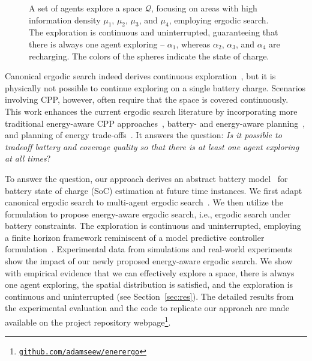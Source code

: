 \documentclass[letterpaper,10pt,conference,twoside]{IEEEtran}
\theoremstyle{definition}
\begin{document}
\begin{figure}[t!]
  \centering
  \hspace*{-.04cm}
  \caption{A set of agents explore a space $\mathcal{Q}$, focusing on areas with high information density $\mu_1$, $\mu_2$, $\mu_3$, and $\mu_4$, employing ergodic search. The exploration is continuous and uninterrupted, guaranteeing that there is always one agent exploring -- $\alpha_1$, whereas $\alpha_2$, $\alpha_3$, and $\alpha_4$ are recharging. The colors of the spheres indicate the state of charge.}
  \label{fig:abs}
  \vspace*{-.2cm}
\end{figure}

Canonical ergodic search indeed derives continuous exploration~\cite{%
miller2013trajectory,miller2016ergodic,abraham2017ergodic}, but it is physically not possible to continue exploring on a single battery charge. 
Scenarios involving CPP, however, often require that the space is covered continuously.
This work enhances the current ergodic search literature by incorporating more traditional energy-aware CPP approaches~\cite{difranco2015energy,difranco2016coverage,shnaps2016online,cabreira2018energy,wei2018coverage,jensen2021near}, battery- and energy-aware planning~\cite{mei2004energy,mei2005case,kim2005energy,seewald2022energy}, and planning of energy trade-offs~\cite{ondruska2015scheduled,sudhakar2020balancing}. It answers the question: \textit{Is it possible to tradeoff battery and coverage quality so that there is at least one agent exploring %
at all times}?

To answer the question, our approach derives an abstract battery model~\cite{zhao2017observability} for battery state of charge (SoC) estimation at future time instances. We first adapt canonical ergodic search to multi-agent ergodic search~\cite{prabhakar2020ergodic,coffin2022multi}. We then utilize the formulation to propose energy-aware ergodic search, i.e., ergodic search under battery constraints. The exploration is continuous and uninterrupted, employing a finite horizon framework reminiscent of a model predictive controller formulation~\cite{seewald2022energy}. %
Experimental data from simulations and real-world experiments show the impact of our newly proposed energy-aware ergodic search. We show with empirical evidence that we can effectively explore a space, %
there is always one agent exploring, the spatial distribution is satisfied, and the exploration is continuous and uninterrupted (see Section~\ref{sec:res}). The detailed results from the experimental evaluation and the code to replicate our approach are made available on the project repository webpage\footnote{\label{reflink}{\tt\footnotesize\href{https://github.com/adamseew/enerergo}{github.com/adamseew/enerergo}}}.
\end{document}
